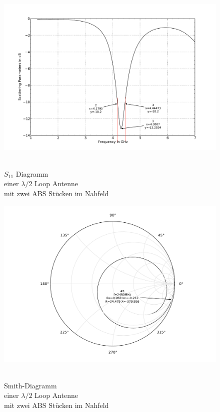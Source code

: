 \begin{figure}[!ht]
	\begin{center}
 	\includegraphics[width=\linewidth]{content/bilder/Evaluation/Loop/L2/2ABS/S11_Loop_Lambda2_mit2ABS.pdf}
  	\caption{\\$S_{11}$ Diagramm \\einer $\lambda/2$ Loop Antenne \\mit zwei ABS Stücken im Nahfeld}				\label{fig:S11_Lambda2_Loop_2ABS_5}
\endminipage%
 	\includegraphics[width=\linewidth]{content/bilder/Evaluation/Loop/L2/2ABS/Smith_Loop_Lambda2_mit2ABS.pdf}
  	\caption{\\Smith-Diagramm \\einer $\lambda/2$ Loop Antenne \\ mit zwei ABS Stücken im Nahfeld}		\label{fig:Smith_Lambda2_Loop_2ABS_6}
	\endminipage
	\end{center}
\end{figure}
